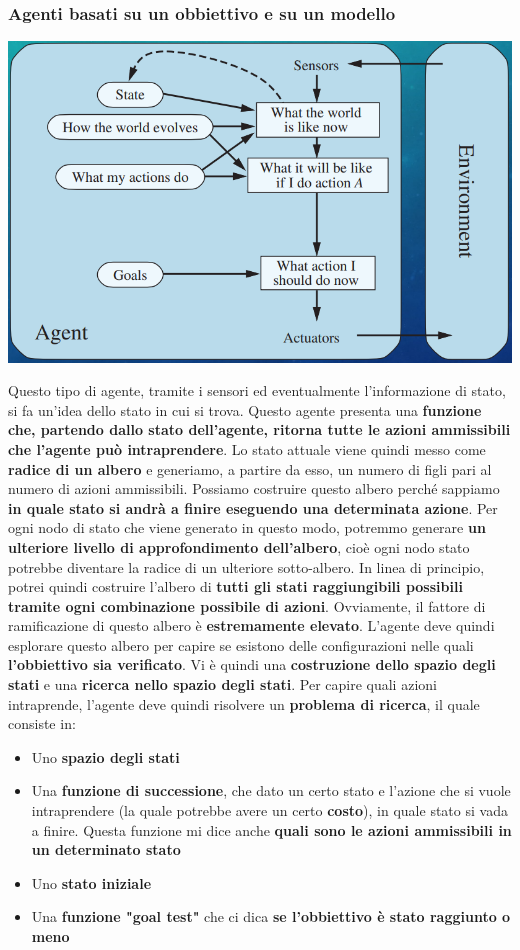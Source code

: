 \documentclass[12pt]{article}
\begin{document}
\subsubsection{Agenti basati su un obbiettivo e su un modello}
\begin{center}
    \includegraphics[width = 0.70\linewidth]{Images/12.PNG}
\end{center}
Questo tipo di agente, tramite i sensori ed eventualmente l'informazione di stato, si fa un'idea dello stato in cui si trova.
Questo agente presenta una \textbf{funzione che, partendo dallo stato dell'agente, ritorna tutte le azioni ammissibili che l'agente può intraprendere}.
Lo stato attuale viene quindi messo come \textbf{radice di un albero} e generiamo, a partire da esso, un numero di figli pari al numero di azioni ammissibili.
Possiamo costruire questo albero perché sappiamo \textbf{in quale stato si andrà a finire eseguendo una determinata azione}.
Per ogni nodo di stato che viene generato in questo modo, potremmo generare \textbf{un ulteriore livello di approfondimento dell'albero}, cioè ogni nodo stato potrebbe diventare la radice di un ulteriore sotto-albero.
In linea di principio, potrei quindi costruire l'albero di \textbf{tutti gli stati raggiungibili possibili tramite ogni combinazione possibile di azioni}.
Ovviamente, il fattore di ramificazione di questo albero è \textbf{estremamente elevato}. L'agente deve quindi esplorare questo albero per capire se esistono delle configurazioni nelle quali \textbf{l'obbiettivo sia verificato}.
Vi è quindi una \textbf{costruzione dello spazio degli stati} e una \textbf{ricerca nello spazio degli stati}. \newline
Per capire quali azioni intraprende, l'agente deve quindi risolvere un \textbf{problema di ricerca}, il quale consiste in:
\begin{itemize}
    \item Uno \textbf{spazio degli stati}
    \item Una \textbf{funzione di successione}, che dato un certo stato e l'azione che si vuole intraprendere (la quale potrebbe avere un certo \textbf{costo}), in quale stato si vada a finire. Questa funzione mi dice anche \textbf{quali sono le azioni ammissibili in un determinato stato}
    \item Uno \textbf{stato iniziale}
    \item Una \textbf{funzione "goal test"} che ci dica \textbf{se l'obbiettivo è stato raggiunto o meno}
\end{itemize}
\end{document}
